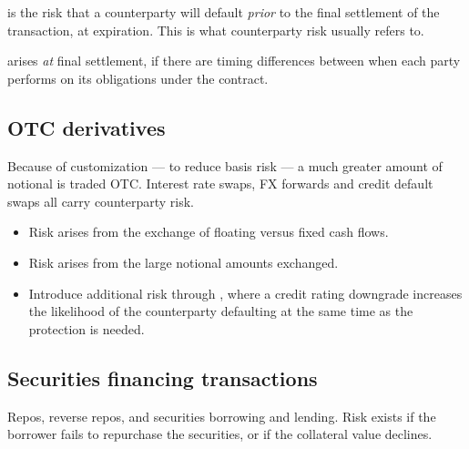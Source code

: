 \begin{crdefbox}
 is the risk that a counterparty will default
\emph{prior} to the final settlement of the transaction, at expiration. This is
what counterparty risk usually refers to.

\smallskip
{} arises \emph{at} final settlement, if there are timing
differences between when each party performs on its obligations under the
contract.
\end{crdefbox}


\subsection*{OTC derivatives}

Because of customization --- to reduce basis risk --- a much greater amount of
notional is traded OTC. Interest rate swaps, FX forwards and credit default swaps
all carry counterparty risk.

\begin{itemize}
\item {} Risk arises from the exchange of floating
versus fixed cash flows.
\item {} Risk arises from the large notional
amounts exchanged.
\item {} Introduce additional risk through
, where a credit rating downgrade increases the likelihood
of the counterparty defaulting at the same time as the protection is needed.
\end{itemize}

\subsection*{Securities financing transactions}

Repos, reverse repos, and securities borrowing and lending. Risk exists if the
borrower fails to repurchase the securities, or if the collateral value declines.

